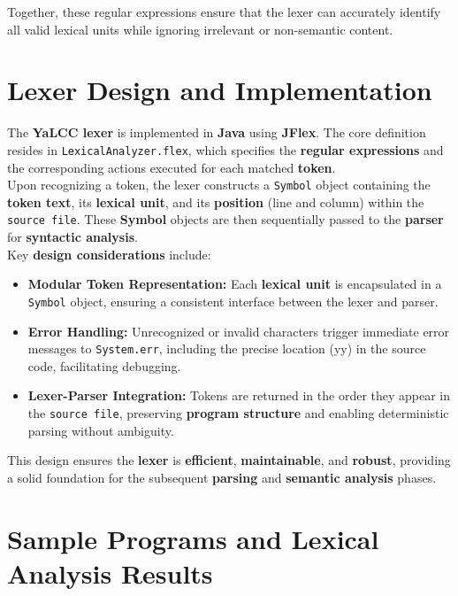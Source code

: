\documentclass{article}
\begin{document}
\noindent Together, these regular expressions ensure that the lexer can accurately identify all valid lexical units while ignoring irrelevant or non-semantic content.

\section{Lexer Design and Implementation}

\noindent The \textbf{YaLCC lexer} is implemented in \textbf{Java} using \textbf{JFlex}. The core definition resides in \texttt{LexicalAnalyzer.flex}, which specifies the \textbf{regular expressions} and the corresponding actions executed for each matched \textbf{token}. \\

\noindent Upon recognizing a token, the lexer constructs a \texttt{Symbol} object containing the \textbf{token text}, its \textbf{lexical unit}, and its \textbf{position} (line and column) within the \texttt{source file}. These \textbf{Symbol} objects are then sequentially passed to the \textbf{parser} for \textbf{syntactic analysis}. \\

\noindent Key \textbf{design considerations} include:

\begin{itemize}
    \item \textbf{Modular Token Representation:} Each \textbf{lexical unit} is encapsulated in a \texttt{Symbol} object, ensuring a consistent interface between the lexer and parser.
    \item \textbf{Error Handling:} Unrecognized or invalid characters trigger immediate error messages to \texttt{System.err}, including the precise location (yy) in the source code, facilitating debugging.
    \item \textbf{Lexer-Parser Integration:} Tokens are returned in the order they appear in the \texttt{source file}, preserving \textbf{program structure} and enabling deterministic parsing without ambiguity.
\end{itemize}

\noindent This design ensures the \textbf{lexer} is \textbf{efficient}, \textbf{maintainable}, and \textbf{robust}, providing a solid foundation for the subsequent \textbf{parsing} and \textbf{semantic analysis} phases.


\section{Sample Programs and Lexical Analysis Results}
\end{document}

